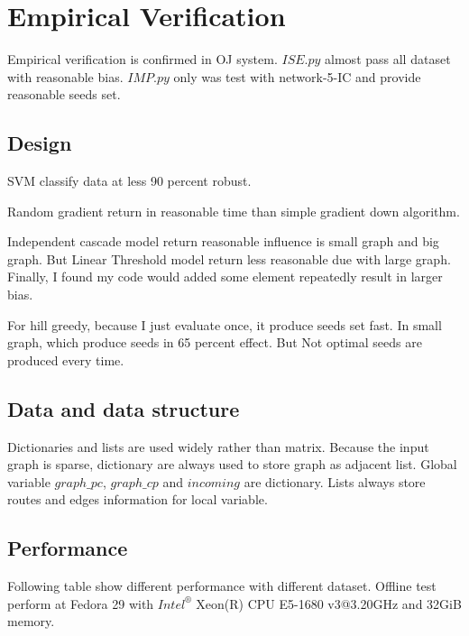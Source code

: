\documentclass[conference,compsoc]{IEEEtran}
\begin{document}
\section{Empirical Verification}
Empirical verification is confirmed in OJ system. $ISE.py$ almost pass all
dataset with reasonable bias. $IMP.py$ only was test with network-5-IC and
provide reasonable seeds set.

\subsection{Design}
SVM classify data at less 90 percent robust.

Random gradient return in reasonable time than simple gradient down algorithm.

Independent cascade model return reasonable influence is small graph and big graph.
But Linear Threshold model return less reasonable due with large graph. Finally,
I found my code would added some element repeatedly result in larger bias.

For hill greedy, because I just evaluate once, it produce seeds set fast. In
small graph, which produce seeds in 65 percent effect. But
Not optimal seeds are produced every time.

\subsection{Data and data structure}
Dictionaries and lists are used widely rather than matrix. Because the input graph
is sparse, dictionary are always used to store graph as adjacent list. Global
variable $graph\_pc$, $graph\_cp$ and $incoming$ are dictionary. Lists always
store routes and edges information for local variable.

\subsection{Performance}
Following table show different performance with different dataset. Offline
test perform at Fedora 29 with $Intel^{®}$ Xeon(R) CPU E5-1680 v3@3.20GHz and
32GiB memory.
\end{document}
